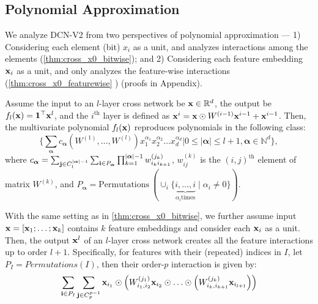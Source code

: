 \documentclass[sigconf]{acmart}
\newcommand{\vecx}{{\bf x}}
\newcommand{\veci}{{\bf i}}
\newcommand{\vecj}{{\bf j}}
\newcommand{\vecalpha}{{\bm \alpha}}
\begin{document}
\subsection{Polynomial Approximation}
\label{sec:poly_analysis}
We analyze {DCN-V2} from two perspectives of polynomial approximation ---
1) Considering each element (bit) $x_i$ as a unit, and analyzes interactions among the elements (\autoref{thm:cross_x0_bitwise}); and 2) Considering each feature embedding $\vecx_i$ as a unit, and only analyzes the feature-wise interactions (\autoref{thm:cross_x0_featurewise} ) (proofs in Appendix). 

\begin{theorem}[Bitwise]
\label{thm:cross_x0_bitwise}
	Assume the input to an $l$-layer cross network be $\vecx \in \mathbb{R}^d$, the output be $f_l(\vecx)={\bf 1}^\top \vecx^l$, and the $i^\text{th}$ layer is defined as $\vecx^i =\vecx \odot W^{(i-1)}\vecx^{i-1} +\vecx^{i-1}$. Then, the multivariate polynomial $f_l(\vecx)$ reproduces polynomials in the following class:
    $$\biggl\{\sum_{\vecalpha} c_{\vecalpha}\left(W^{(1)}, \ldots, W^{(l)}\right) x_1^{\alpha_1}x_2^{\alpha_2}\ldots x_d^{\alpha_d} \mathrel{\bigg|}  0 \le |\vecalpha| \le l+1, \vecalpha \in \mathbb{N}^d \biggr\},$$
    where $c_\vecalpha = \sum_{\vecj \in C_l^{|\vecalpha|-1}}  \sum_{\veci \in P_\vecalpha} \prod_{k=1}^{|\vecalpha|-1} w_{i_k i_{k+1}}^{(j_k)}$, $w_{i j}^{(k)}$ is the $(i,j)^\text{th}$ element of matrix $W^{(k)}$, and $P_\vecalpha = \text{Permutations}~(\cup_i \{\underbrace{i, \ldots, i}_{\alpha_i \text{times}} \mathrel{|} \alpha_i \neq 0\})$.
\end{theorem}



\begin{theorem}
\label{thm:cross_x0_featurewise}
  With the same setting as in \autoref{thm:cross_x0_bitwise}, we further assume input $\vecx = [\vecx_1; \ldots; \vecx_k]$ contains $k$ feature embeddings and consider each $\vecx_i$ as a unit. Then, the output $\vecx^l$ of an $l$-layer cross network creates all the feature interactions up to order $l+1$. Specifically, for features with their (repeated) indices in $I$, let $P_I = Permutations (I)$, then their order-$p$ interaction is given by:
\begin{equation*}
\begin{split}
\sum_{{\bf i} \in P_I} \sum_{\vecj \in C_p^{p-1}} \vecx_{i_1} \odot \left(W_{i_1, i_2}^{(j_1)} \vecx_{i_2} \odot \ldots \odot \left(W_{i_k, i_{k+1}}^{(j_{k})} \vecx_{i_{l+1}}\right) \right)
\end{split}
\end{equation*}


\end{theorem}
\end{document}
